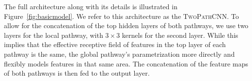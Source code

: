 \documentclass[final,5p,times,twocolumn]{elsarticle}
\newcommand{\PMJ}[1]{\textcolor{green}{\small{}[\textbf{Pierre-Marc:} #1]}}
\begin{document}
 The full architecture along with its details is illustrated in Figure~\ref{fig:basicmodel}. We refer to this architecture as the \textsc{TwoPathCNN}.
To allow for the concatenation of the top hidden layers of both pathways, we use two layers for the local pathway, with $3\times3$ kernels for the second layer. While this implies that the effective receptive field of features in the top layer of each pathway is the same, the global pathway's parametrization more directly and flexibly models features in that same area. The concatenation of the feature maps of both pathways is then fed to the output layer. %










\end{document}
